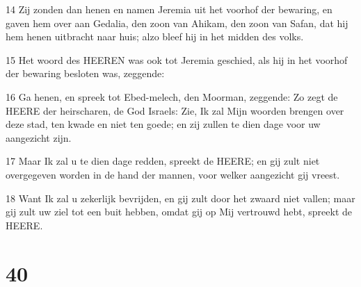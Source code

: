 \par 14 Zij zonden dan henen en namen Jeremia uit het voorhof der bewaring, en gaven hem over aan Gedalia, den zoon van Ahikam, den zoon van Safan, dat hij hem henen uitbracht naar huis; alzo bleef hij in het midden des volks.
\par 15 Het woord des HEEREN was ook tot Jeremia geschied, als hij in het voorhof der bewaring besloten was, zeggende:
\par 16 Ga henen, en spreek tot Ebed-melech, den Moorman, zeggende: Zo zegt de HEERE der heirscharen, de God Israels: Zie, Ik zal Mijn woorden brengen over deze stad, ten kwade en niet ten goede; en zij zullen te dien dage voor uw aangezicht zijn.
\par 17 Maar Ik zal u te dien dage redden, spreekt de HEERE; en gij zult niet overgegeven worden in de hand der mannen, voor welker aangezicht gij vreest.
\par 18 Want Ik zal u zekerlijk bevrijden, en gij zult door het zwaard niet vallen; maar gij zult uw ziel tot een buit hebben, omdat gij op Mij vertrouwd hebt, spreekt de HEERE.

\chapter{40}

